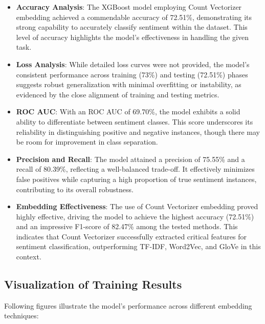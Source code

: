 \begin{itemize}
    \item \textbf{Accuracy Analysis}: The XGBoost model employing Count Vectorizer embedding achieved a commendable accuracy of 72.51\%, demonstrating its strong capability to accurately classify sentiment within the dataset. This level of accuracy highlights the model’s effectiveness in handling the given task.
    \item \textbf{Loss Analysis}: While detailed loss curves were not provided, the model’s consistent performance across training (73\%) and testing (72.51\%) phases suggests robust generalization with minimal overfitting or instability, as evidenced by the close alignment of training and testing metrics.
    \item \textbf{ROC AUC}: With an ROC AUC of 69.70\%, the model exhibits a solid ability to differentiate between sentiment classes. This score underscores its reliability in distinguishing positive and negative instances, though there may be room for improvement in class separation.
    \item \textbf{Precision and Recall}: The model attained a precision of 75.55\% and a recall of 80.39\%, reflecting a well-balanced trade-off. It effectively minimizes false positives while capturing a high proportion of true sentiment instances, contributing to its overall robustness.
    \item \textbf{Embedding Effectiveness}: The use of Count Vectorizer embedding proved highly effective, driving the model to achieve the highest accuracy (72.51\%) and an impressive F1-score of 82.47\% among the tested methods. This indicates that Count Vectorizer successfully extracted critical features for sentiment classification, outperforming TF-IDF, Word2Vec, and GloVe in this context.
\end{itemize}

\subsection{Visualization of Training Results}

Following figures illustrate the model’s performance across different embedding techniques:

